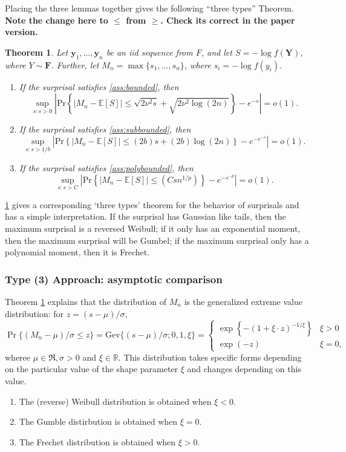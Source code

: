 \documentclass[a4paper,11pt]{article}
\newcommand{\E}{\mathbb{E}}
\newtheorem{theorem}{Theorem}
\begin{document}
Placing the three lemmas together gives the following ``three types'' Theorem.
\textbf{\color{blue}Note the change here to $\le$ from $\ge$. Check its correct in the paper version.}
\begin{theorem}\label{thm:three_types}
	Let $\bm{y}_1,\dots,\bm{y}_n$ be an iid sequence from $F$, and let $S =-\log f(\bm{Y})$, where $Y\sim \bm{F}$. Further, let $M_n=\max\{s_1,\dots,s_n\}$, where $s_i=-\log f(y_i)$.
	\begin{enumerate}
		\item If the surprisal satisfies \cref{ass:bounded}, then
		      $$
			      \sup_{s:s>0}\left|\mathrm{Pr}\left\{|M_n-\E[S]|\le \sqrt{2\nu^2 s}+\sqrt{2\nu^2\log(2n)}\right\}-e^{-s}\right|=o(1).
		      $$
		\item If the surprisal satisfies \cref{ass:subbounded}, then
		      $$
			      \sup_{s:s>1/b}\left|\mathrm{Pr}\left\{|M_n-\E[S]|\le (2b)s+(2b)\log(2n)\right\}-e^{-e^{-s}}\right|=o(1).
		      $$
		\item If the surprisal satisfies \cref{ass:polybounded}, then
		      $$
			      \sup_{s:s>C}\left|\mathrm{Pr}\left\{|M_n-\E[S]|\le (Csn^{1/p})\right\}-e^{-s^{-p}}\right|=o(1).
		      $$
	\end{enumerate}
\end{theorem}

\cref{thm:three_types} gives a corresponding `three types' theorem for the behavior of surprisals and has a simple interpretation. If the surprisal has Gaussian like tails, then the maximum surprisal is a reversed Weibull; if it only has an exponential moment, then the maximum surprisal will be Gumbel; if the maximum surprisal only has a polynomial moment, then it is Frechet.


\subsubsection{Type (3) Approach: asymptotic comparison}
Theorem \ref{thm:three_types} explains that the distribution of $M_n$ is the generalized extreme value distribution: for $z=(s-\mu)/\sigma$,
$$
	\Pr\{(M_n-\mu)/\sigma\le z\}=\mathrm{Gev}\{(s-\mu)/\sigma;0,1,\xi\}=\begin{cases}
	\exp \left\{-\left(1+\xi\cdot z\right)^{-1 / \xi}\right\} &\xi>0\\\exp(-z)&\xi=0,    
	\end{cases}
$$
wheree $\mu \in \Re, \sigma>0$ and $\xi \in \mathbb{R}$. This distribution takes specific forms depending on the particular value of the shape parameter $\xi$ and changes depending on this value. 
\begin{enumerate}
	\item The (reverse) Weibull distribution is obtained when $\xi<0$.
	\item The Gumble distirbution is obtained when $\xi=0$.
	\item The Frechet distribution is obtained when $\xi>0$.
\end{enumerate}
\end{document}
